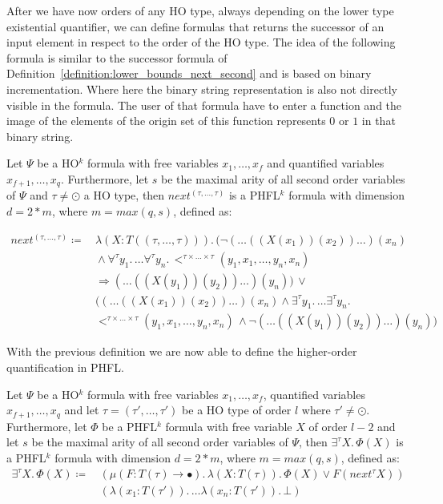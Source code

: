 After we have now orders of any HO type, always depending on the lower type existential quantifier, we can define
formulas that returns the successor of an input element in respect to the order of the HO type. The idea of the
following formula is similar to the successor formula of Definition~\ref{definition:lower_bounds_next_second} and is
based on binary incrementation. Where here the binary string representation is also not directly visible in the
formula. The user of that formula have to enter a function and the image of the elements of the origin set of this
function represents $0$ or $1$ in that binary string.

\begin{definition}
    \label{definition:lower_bounds_next_higher}
    Let $\Psi$ be a HO$^k$ formula with free variables $x_1, \dots, x_f$ and quantified variables $x_{f+1}, \dots,
    x_q$. Furthermore, let $s$ be the maximal arity of all second order variables of $\Psi$ and $\tau \neq \odot$ a
    HO type, then $next^{(\tau, \dots, \tau)}$ is a PHFL$^k$ formula with dimension $d = 2 * m$, where $m = max({q,
    s})$, defined as:

    \begin{align*}
        next^{(\tau, \dots, \tau)} \coloneqq &\,\lambda (X \colon T ((\tau, \dots, \tau))).\,(\neg (\dots((X
        (x_1))(x_2))\dots) (x_n) \\&\, \wedge \forall^{\tau}y_1.\, \dots \forall^{\tau}y_n.\,<^{\tau \times
        \dots \times \tau}(y_1, x_1, \dots, y_n, x_n) \\&\,\Rightarrow  (\dots((X(y_1))(y_2))\dots)(y_n)) \,\vee
        \\&\,((\dots ((X(x_1))(x_2)) \dots)(x_n) \wedge \exists^{\tau}y_1.\, \dots \exists^{\tau}y_n.\, \\&\,
        <^{\tau \times \dots \times \tau}
        (y_1, x_1, \dots, y_n, x_n)\,\wedge \neg (\dots((X(y_1))(y_2))\dots)(y_n))
    \end{align*}
\end{definition}

With the previous definition we are now able to define the higher-order quantification in PHFL.

\begin{definition}
    \label{definition:existential_quantification_higher}
    Let $\Psi$ be a HO$^k$ formula with free variables $x_1, \dots, x_f$, quantified variables $x_{f+1}, \dots,
    x_q$ and let $\tau = (\tau', \dots, \tau')$ be a HO type of order $l$ where $\tau' \neq \odot$. Furthermore, let
    $\Phi$ be a PHFL$^k$
    formula with free variable $X$ of order $l - 2$ and let $s$ be the maximal arity
    of all second order variables of $\Psi$, then $\exists^{\tau}X .\,\Phi(X)$
    is a PHFL$^k$ formula with dimension $d = 2 * m$, where $m = max({q, s})$, defined as:
    \begin{align*}
        \exists^{\tau}X.\, \Phi(X) \coloneqq &\,(\mu (F \colon T(\tau) \rightarrow \bullet).\, \lambda (X \colon T(\tau)
        ).\,
        \Phi(X)
        \vee F(next^\tau X))\\&\,(\lambda (x_1 \colon T(\tau')).\, \dots \lambda (x_n \colon T(\tau')).\,\bot)
    \end{align*}
\end{definition}

